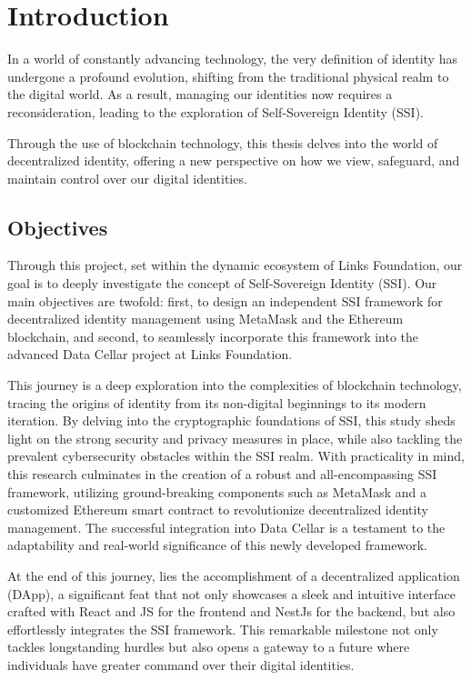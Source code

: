\hypersetup{
    colorlinks=true,
    linkcolor=blue
}

\chapter{Introduction} \label{ch:intro}

In a world of constantly advancing technology, the very definition of identity has undergone a 
profound evolution, shifting from the traditional physical realm to the digital world. As a 
result, managing our identities now requires a reconsideration, leading to the exploration of 
Self-Sovereign Identity (SSI). 

Through the use of blockchain technology, this thesis delves into the world of decentralized 
identity, offering a new perspective on how we view, safeguard, and maintain control over our 
digital identities.

\section{Objectives} 

Through this project, set within the dynamic ecosystem of Links Foundation, our goal is to deeply 
investigate the concept of Self-Sovereign Identity (SSI). Our main objectives are twofold: first, 
to design an independent SSI framework for decentralized identity management using MetaMask and 
the Ethereum blockchain, and second, to seamlessly incorporate this framework into the advanced 
Data Cellar project at Links Foundation.

This journey is a deep exploration into the complexities of blockchain technology, tracing the 
origins of identity from its non-digital beginnings to its modern iteration. By delving into the 
cryptographic foundations of SSI, this study sheds light on the strong security and privacy 
measures in place, while also tackling the prevalent cybersecurity obstacles within the SSI 
realm. With practicality in mind, this research culminates in the creation of a robust and 
all-encompassing SSI framework, utilizing ground-breaking components such as MetaMask and a 
customized Ethereum smart contract to revolutionize decentralized identity management. 
The successful integration into Data Cellar is a testament to the adaptability and real-world 
significance of this newly developed framework.

At the end of this journey, lies the accomplishment of a decentralized application (DApp), a 
significant feat that not only showcases a sleek and intuitive interface crafted with React and 
JS for the frontend and NestJs for the backend, but also effortlessly integrates the SSI 
framework. This remarkable milestone not only tackles longstanding hurdles but also opens a 
gateway to a future where individuals have greater command over their digital identities.

